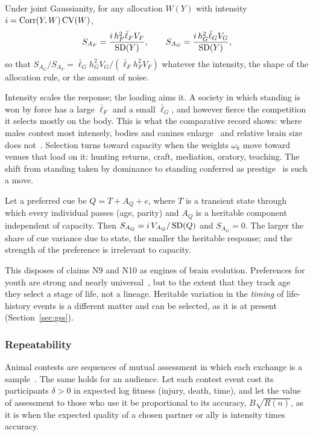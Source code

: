 \begin{proposition}\label{prop:aim}
Under joint Gaussianity, for any allocation $W(Y)$ with intensity $i=\operatorname{Corr}(Y,W)\operatorname{CV}(W)$,
\begin{equation}
S_{A_F}=\frac{i\,h_F^2\bar\ell_FV_F}{\operatorname{SD}(Y)},\qquad S_{A_G}=\frac{i\,h_G^2\bar\ell_GV_G}{\operatorname{SD}(Y)},\label{eq:aim}
\end{equation}
so that $S_{A_G}/S_{A_F}=\bar\ell_Gh_G^2V_G/(\bar\ell_Fh_F^2V_F)$ whatever the intensity, the shape of the allocation rule, or
the amount of noise.
\end{proposition}

Intensity scales the response; the loading aims it. A society in which standing is won by force has a large $\bar\ell_F$ and
a small $\bar\ell_G$, and however fierce the competition it selects mostly on the body. This is what the comparative record
shows: where males contest most intensely, bodies and canines enlarge~\cite{plavcan2012} and relative brain size does
not~\cite{schillaci2006,lemaitre2009,fitzpatrick2012}. Selection turns toward capacity when the weights $\omega_k$ move toward
venues that load on it: hunting returns, craft, mediation, oratory, teaching. The shift from standing taken by dominance to
standing conferred as prestige~\cite{henrich2001,cheng2013} is such a move.

\begin{corollary}\label{cor:cue}
Let a preferred cue be $Q=T+A_Q+e$, where $T$ is a transient state through which every individual passes (age, parity) and
$A_Q$ is a heritable component independent of capacity. Then $S_{A_Q}=i\,V_{A_Q}/\operatorname{SD}(Q)$ and $S_{A_G}=0$. The larger the share
of cue variance due to state, the smaller the heritable response; and the strength of the preference is irrelevant to
capacity.
\end{corollary}

This disposes of claims N9 and N10 as engines of brain evolution. Preferences for youth are strong and nearly
universal~\cite{kenrick1992}, but to the extent that they track age they select a stage of life, not a lineage. Heritable
variation in the \emph{timing} of life-history events is a different matter and can be selected, as it is at present
(Section~\ref{sec:gss}).

\subsubsection{Repeatability} Animal contests are sequences of mutual assessment in which each exchange is a
sample~\cite{enquist1983,arnott2009}. The same holds for an audience. Let each contest event cost its participants $\delta>0$
in expected log fitness (injury, death, time), and let the value of assessment to those who use it be proportional to its
accuracy, $B\sqrt{R(n)}$, as it is when the expected quality of a chosen partner or ally is intensity times accuracy.

